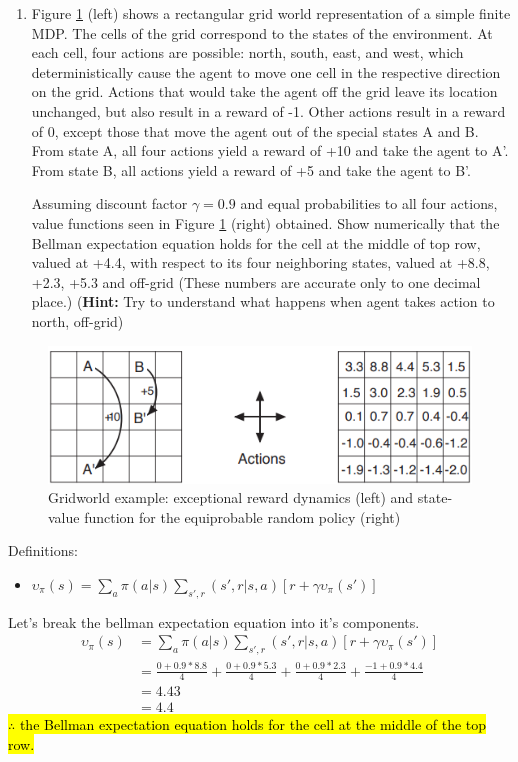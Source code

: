 \documentclass[11pt,onecolumn]{article}
\begin{document}
\begin{enumerate}
    \item Figure \ref{fig:book3.14} (left) shows a rectangular grid world representation of a simple finite MDP. The cells of the grid correspond to the states of the environment. At each cell, four actions are possible: north, south, east, and west, which deterministically cause the agent to move one cell in the respective direction on the grid. Actions that would take the agent off the grid leave its location unchanged, but also result in a reward of -1. Other actions result in a reward of 0, except those that move the agent out of the special states A and B. From state A, all four actions yield a reward of +10 and take the agent to A'. From state B, all actions yield a reward of +5 and take the agent to B'. 
    
    Assuming discount factor $\gamma=0.9$ and equal probabilities to all four actions, value functions seen in Figure \ref{fig:book3.14} (right) obtained. Show numerically that the Bellman expectation equation holds for the cell at the middle of top row, valued at +4.4, with respect to its four neighboring states, valued at +8.8, +2.3, +5.3 and off-grid (These numbers are accurate only to one decimal place.) (\textbf{Hint:} Try to understand what happens when agent takes action to north, off-grid)
    
\end{enumerate}

\begin{figure}[htbp]
    \centering
    \includegraphics[width=0.6\linewidth]{figures/mdp_grid.png}
    
    \caption{Gridworld example: exceptional reward dynamics (left) and state-value function for the equiprobable random policy (right)}
    \label{fig:book3.14}
\end{figure}
\setlength{\parskip}{6pt}

Definitions:
\begin{itemize}
    \item $\upsilon_{\pi}(s) = \sum_{a} \pi(a \vert s) \sum_{s \prime, r}(s\prime, r \vert s, a)[r + \gamma\upsilon_{\pi}(s\prime)]$
\end{itemize}
Let's break the bellman expectation equation into it's components.
\begin{equation}
    \begin{aligned}
        \upsilon_{\pi}(s) & = \sum_{a} \pi(a \vert s) \sum_{s \prime, r}(s\prime, r \vert s, a)[r + \gamma\upsilon_{\pi}(s\prime)] \\
        & = \frac{0+0.9*8.8}{4}+\frac{0+0.9*5.3}{4} + \frac{0+0.9*2.3}{4} + \frac{-1+0.9*4.4}{4} \\ 
        & = 4.43 \\ 
        & = 4.4
    \end{aligned}
\end{equation}
\hl{$\therefore$ the Bellman expectation equation holds for the cell at the middle of the top row.}
\end{document}
